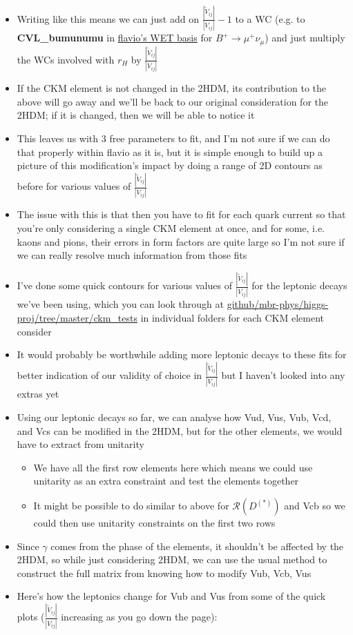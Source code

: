 \documentclass[11pt]{article}
\newcommand{\tVV}{\frac{|\tilde{V}_{ij}|}{|V_{ij}|}}
\begin{document}
\begin{itemize}
\begin{align*}
        \end{align*}
    \item Writing like this means we can just add on $\tVV-1$ to a WC (e.g. to \textbf{CVL\_bumunumu} in \href{https://wcxf.github.io/assets/pdf/WET.flavio.pdf}{flavio's WET basis} for $B^+\to\mu^+\nu_\mu$) and just multiply the WCs involved with $r_H$ by $\tVV$ 
    \item If the CKM element is not changed in the 2HDM, its contribution to the above will go away and we'll be back to our original consideration for the 2HDM; if it is changed, then we will be able to notice it
    \item This leaves us with 3 free parameters to fit, and I'm not sure if we can do that properly within flavio as it is, but it is simple enough to build up a picture of this modification's impact by doing a range of 2D contours as before for various values of $\tVV$
    \item The issue with this is that then you have to fit for each quark current so that you're only considering a single CKM element at once, and for some, i.e. kaons and pions, their errors in form factors are quite large so I'm not sure if we can really resolve much information from those fits
    \item I've done some quick contours for various values of $\tVV$ for the leptonic decays we've been using, which you can look through at \href{https://github.com/mbr-phys/higgs-proj/tree/master/ckm_tests}{github/mbr-phys/higgs-proj/tree/master/ckm\_tests} in individual folders for each CKM element consider
    \item It would probably be worthwhile adding more leptonic decays to these fits for better indication of our validity of choice in $\tVV$ but I haven't looked into any extras yet
    \item Using our leptonic decays so far, we can analyse how Vud, Vus, Vub, Vcd, and Vcs can be modified in the 2HDM, but for the other elements, we would have to extract from unitarity 
        \begin{itemize}
            \item We have all the first row elements here which means we could use unitarity as an extra constraint and test the elements together
            \item It might be possible to do similar to above for $\mathcal{R}(D^{(*)})$ and Vcb so we could then use unitarity constraints on the first two rows
        \end{itemize}
    \item Since $\gamma$ comes from the phase of the elements, it shouldn't be affected by the 2HDM, so while just considering 2HDM, we can use the usual method to construct the full matrix from knowing how to modify Vub, Vcb, Vus
    \item Here's how the leptonics change for Vub and Vus from some of the quick plots ($\tVV$ increasing as you go down the page):
\end{itemize}
\end{document}
